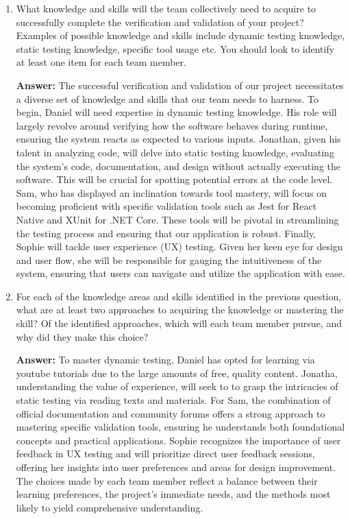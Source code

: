 \documentclass[12pt, titlepage]{article}
\begin{document}
\begin{enumerate}
  \item What knowledge and skills will the team collectively need to acquire to successfully complete the verification and validation of your project? Examples of possible knowledge and skills include dynamic testing knowledge, static testing knowledge, specific tool usage etc. You should look to identify at least one item for each team member.

  \textbf{Answer:}
  The successful verification and validation of our project necessitates a diverse set of knowledge and skills that our team needs to harness. To begin, Daniel will need expertise in dynamic testing knowledge. His role will largely revolve around verifying how the software behaves during runtime, ensuring the system reacts as expected to various inputs. Jonathan, given his talent in analyzing code, will delve into static testing knowledge, evaluating the system's code, documentation, and design without actually executing the software. This will be crucial for spotting potential errors at the code level. Sam, who has displayed an inclination towards tool mastery, will focus on becoming proficient with specific validation tools such as Jest for React Native and XUnit for .NET Core. These tools will be pivotal in streamlining the testing process and ensuring that our application is robust. Finally, Sophie will tackle user experience (UX) testing. Given her keen eye for design and user flow, she will be responsible for gauging the intuitiveness of the system, ensuring that users can navigate and utilize the application with ease.

  \item For each of the knowledge areas and skills identified in the previous question, what are at least two approaches to acquiring the knowledge or mastering the skill? Of the identified approaches, which will each team member pursue, and why did they make this choice?

  \textbf{Answer:}
  To master dynamic testing, Daniel has opted for learning via youtube tutorials due to the large amounts of free, quality content. Jonatha, understanding the value of experience, will seek to to grasp the intricacies of static testing via reading texts and materials. For Sam, the combination of official documentation and community forums offers a strong approach to mastering specific validation tools, ensuring he understands both foundational concepts and practical applications. Sophie recognizes the importance of user feedback in UX testing and will prioritize direct user feedback sessions, offering her  insights into user preferences and areas for design improvement. The choices made by each team member reflect a balance between their learning preferences, the project's immediate needs, and the methods most likely to yield comprehensive understanding.
\end{enumerate}
\end{document}
